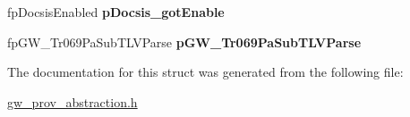 \begin{DoxyCompactItemize}
\item 
\hypertarget{struct____appCallBack_a38f7d834e337627fa4b98ad7422e78fc}{
fpDocsisEnabled {\bfseries pDocsis\_\-gotEnable}}
\label{struct____appCallBack_a38f7d834e337627fa4b98ad7422e78fc}

\item 
\hypertarget{struct____appCallBack_afe2ee53fe866b7171a99575651f4d757}{
fpGW\_\-Tr069PaSubTLVParse {\bfseries pGW\_\-Tr069PaSubTLVParse}}
\label{struct____appCallBack_afe2ee53fe866b7171a99575651f4d757}

\end{DoxyCompactItemize}


The documentation for this struct was generated from the following file:\begin{DoxyCompactItemize}
\item 
\hyperlink{gw__prov__abstraction_8h}{gw\_\-prov\_\-abstraction.h}\end{DoxyCompactItemize}
